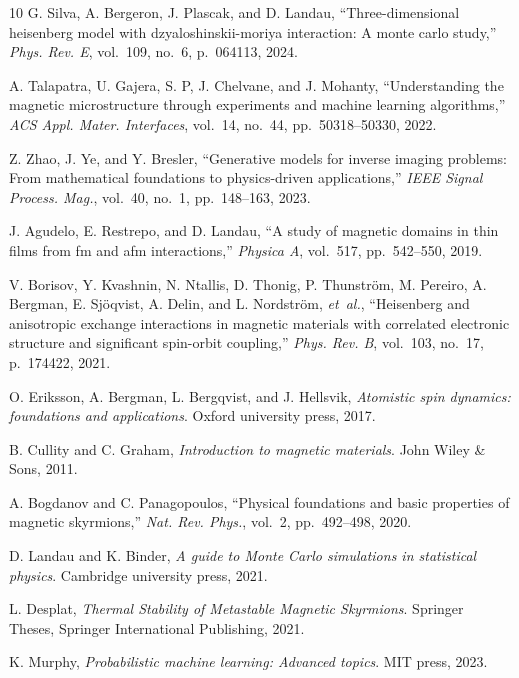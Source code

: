 \documentclass[final,5p,times,twocolumn]{elsarticle}
\begin{document}
\begin{thebibliography}{10}
G. Silva, A. Bergeron, J. Plascak, and D. Landau, ``Three-dimensional heisenberg model with dzyaloshinskii-moriya interaction: A monte carlo study,'' {\em Phys. Rev. E}, vol.~109, no.~6, p.~064113, 2024.

A. Talapatra, U. Gajera, S. P, J. Chelvane, and J. Mohanty, ``Understanding the magnetic microstructure through experiments and machine learning algorithms,'' {\em ACS Appl. Mater. Interfaces}, vol.~14, no.~44, pp.~50318--50330, 2022.

Z. Zhao, J. Ye, and Y. Bresler, ``Generative models for inverse imaging problems: From mathematical foundations to physics-driven applications,'' {\em IEEE Signal Process. Mag.}, vol.~40, no.~1, pp.~148--163, 2023.

J. Agudelo, E. Restrepo, and D. Landau, ``A study of magnetic domains in thin films from fm and afm interactions,'' {\em Physica A}, vol.~517, pp.~542--550, 2019.

V. Borisov, Y. Kvashnin, N. Ntallis, D. Thonig, P. Thunstr{\"o}m, M. Pereiro, A. Bergman, E. Sj{\"o}qvist, A. Delin, and L. Nordstr{\"o}m, {\em et~al.}, ``Heisenberg and anisotropic exchange interactions in magnetic materials with correlated electronic structure and significant spin-orbit coupling,'' {\em Phys. Rev. B}, vol.~103, no.~17, p.~174422, 2021.

O. Eriksson, A. Bergman, L. Bergqvist, and J. Hellsvik, {\em Atomistic spin dynamics: foundations and applications}.
\newblock Oxford university press, 2017.

B. Cullity and C. Graham, {\em Introduction to magnetic materials}.
\newblock John Wiley \& Sons, 2011.

A. Bogdanov and C. Panagopoulos, ``Physical foundations and basic properties of magnetic skyrmions,'' {\em Nat. Rev. Phys.}, vol.~2, pp.~492--498, 2020.

D. Landau and K. Binder, {\em A guide to Monte Carlo simulations in statistical physics}.
\newblock Cambridge university press, 2021.

L. Desplat, {\em Thermal Stability of Metastable Magnetic Skyrmions}. \newblock Springer Theses, Springer International Publishing, 2021.

K. Murphy, {\em Probabilistic machine learning: Advanced topics}.
\newblock MIT press, 2023.


\end{thebibliography}
\end{document}

